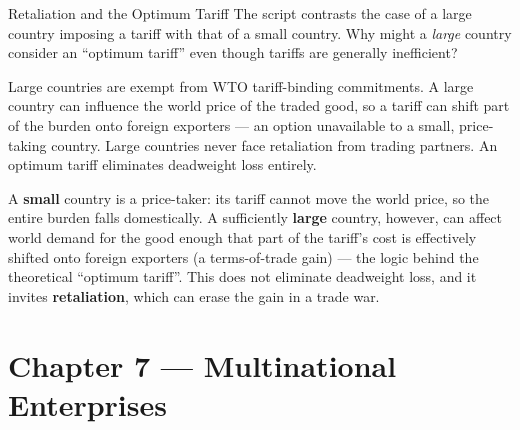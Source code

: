 \begin{question}[type=mc]{Retaliation and the Optimum Tariff}
The script contrasts the case of a large country imposing a tariff with that
of a small country. Why might a \emph{large} country consider an
``optimum tariff'' even though tariffs are generally inefficient?
\begin{choices}
  \choice        Large countries are exempt from WTO tariff-binding
                 commitments.
  \correctchoice A large country can influence the world price of the traded
                 good, so a tariff can shift part of the burden onto foreign
                 exporters --- an option unavailable to a small,
                 price-taking country.
  \choice        Large countries never face retaliation from trading
                 partners.
  \choice        An optimum tariff eliminates deadweight loss entirely.
\end{choices}
\begin{solution}
  A \textbf{small} country is a price-taker: its tariff cannot move the
  world price, so the entire burden falls domestically. A sufficiently
  \textbf{large} country, however, can affect world demand for the good
  enough that part of the tariff's cost is effectively shifted onto foreign
  exporters (a terms-of-trade gain) --- the logic behind the theoretical
  ``optimum tariff''. This does not eliminate deadweight loss, and it
  invites \textbf{retaliation}, which can erase the gain in a trade war.
\end{solution}
\end{question}


\section{Chapter 7 — Multinational Enterprises}

